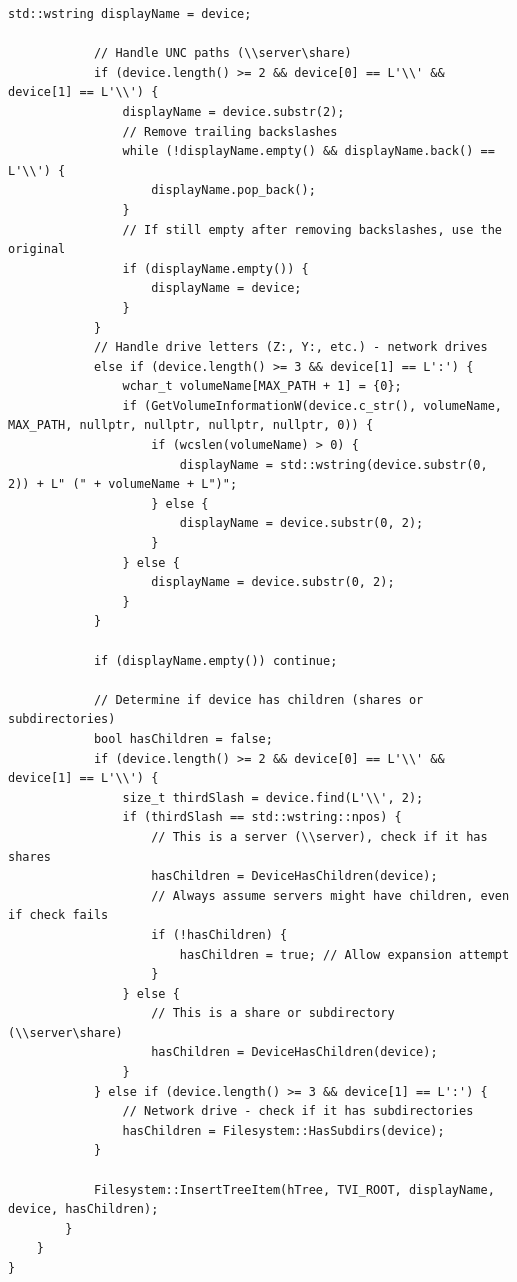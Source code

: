 \begin{lstlisting}[style=CodeListing]
            std::wstring displayName = device;
            
            // Handle UNC paths (\\server\share)
            if (device.length() >= 2 && device[0] == L'\\' && device[1] == L'\\') {
                displayName = device.substr(2);
                // Remove trailing backslashes
                while (!displayName.empty() && displayName.back() == L'\\') {
                    displayName.pop_back();
                }
                // If still empty after removing backslashes, use the original
                if (displayName.empty()) {
                    displayName = device;
                }
            } 
            // Handle drive letters (Z:, Y:, etc.) - network drives
            else if (device.length() >= 3 && device[1] == L':') {
                wchar_t volumeName[MAX_PATH + 1] = {0};
                if (GetVolumeInformationW(device.c_str(), volumeName, MAX_PATH, nullptr, nullptr, nullptr, nullptr, 0)) {
                    if (wcslen(volumeName) > 0) {
                        displayName = std::wstring(device.substr(0, 2)) + L" (" + volumeName + L")";
                    } else {
                        displayName = device.substr(0, 2);
                    }
                } else {
                    displayName = device.substr(0, 2);
                }
            }
            
            if (displayName.empty()) continue;
            
            // Determine if device has children (shares or subdirectories)
            bool hasChildren = false;
            if (device.length() >= 2 && device[0] == L'\\' && device[1] == L'\\') {
                size_t thirdSlash = device.find(L'\\', 2);
                if (thirdSlash == std::wstring::npos) {
                    // This is a server (\\server), check if it has shares
                    hasChildren = DeviceHasChildren(device);
                    // Always assume servers might have children, even if check fails
                    if (!hasChildren) {
                        hasChildren = true; // Allow expansion attempt
                    }
                } else {
                    // This is a share or subdirectory (\\server\share)
                    hasChildren = DeviceHasChildren(device);
                }
            } else if (device.length() >= 3 && device[1] == L':') {
                // Network drive - check if it has subdirectories
                hasChildren = Filesystem::HasSubdirs(device);
            }
            
            Filesystem::InsertTreeItem(hTree, TVI_ROOT, displayName, device, hasChildren);
        }
    }
}
\end{lstlisting}

